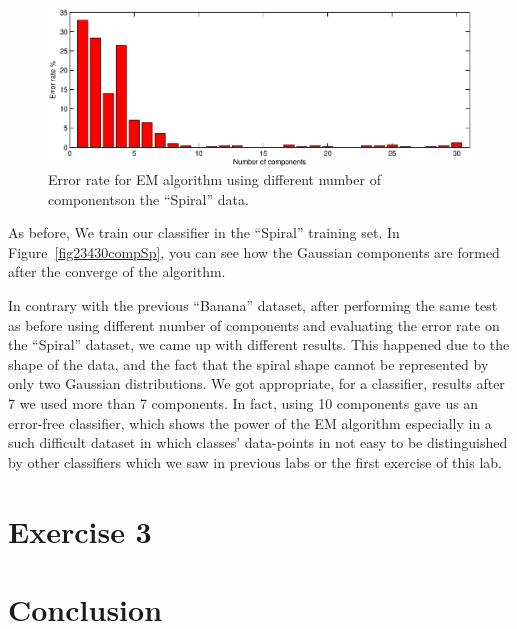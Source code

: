 \documentclass[a4paper,11pt]{article}
\begin{document}
~
\begin{figure}[h!]
  \centering   
      \includegraphics[width=1\textwidth]{figures/30compSp.eps}      
  \caption{Error rate for EM algorithm using different number of componentson the ``Spiral'' data.}
  \label{fig30comp}
\end{figure}


As before, We train our classifier in the ``Spiral'' training set. In Figure~\ref{fig23430compSp}, you can see how the Gaussian components are formed after the converge of the algorithm. 



In contrary with the previous ``Banana'' dataset, after performing the same test as before using different number of components and evaluating the error rate on the ``Spiral'' dataset, we came up with different results. This happened due to the shape of the data, and the fact that the spiral shape cannot be represented by only two Gaussian distributions. We got appropriate, for a classifier, results after 7 we used more than 7 components. In fact, using 10 components gave us an error-free classifier, which shows the power of the EM algorithm especially in a such difficult dataset in which classes' data-points in not easy to be distinguished by other classifiers which we saw in previous labs or the first exercise of this lab.


\section*{Exercise 3}


\newpage
\section*{Conclusion}
\newpage
\end{document}
